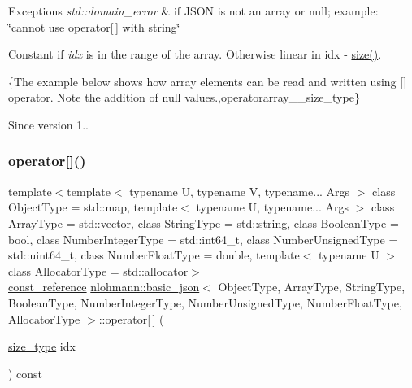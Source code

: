 \begin{DoxyExceptions}{Exceptions}
{\em std\+::domain\+\_\+error} & if J\+S\+ON is not an array or null; example\+: {\ttfamily \char`\"{}cannot use operator\mbox{[}$\,$\mbox{]} with string\char`\"{}}\\
\hline
\end{DoxyExceptions}
Constant if {\itshape idx} is in the range of the array. Otherwise linear in {\ttfamily idx -\/ \hyperlink{classnlohmann_1_1basic__json_a0ea8a1ecca4b3cb0ba09ad7552c364b6}{size()}}.

\{The example below shows how array elements can be read and written using {\ttfamily \mbox{[}\mbox{]}} operator. Note the addition of {\ttfamily null} values.,operatorarray\+\_\+\+\_\+size\+\_\+type\}

\begin{DoxySince}{Since}
version 1.. 
\end{DoxySince}
\hypertarget{classnlohmann_1_1basic__json_a2dea7491d9fa709311459f87201e25aa}{}\label{classnlohmann_1_1basic__json_a2dea7491d9fa709311459f87201e25aa} 
\subsubsection{\texorpdfstring{operator[]()}{operator[]()}\hspace{0.1cm}{\footnotesize\ttfamily [2/10]}}
{\footnotesize\ttfamily template$<$template$<$ typename U, typename V, typename... Args $>$ class Object\+Type = std\+::map, template$<$ typename U, typename... Args $>$ class Array\+Type = std\+::vector, class String\+Type  = std\+::string, class Boolean\+Type  = bool, class Number\+Integer\+Type  = std\+::int64\+\_\+t, class Number\+Unsigned\+Type  = std\+::uint64\+\_\+t, class Number\+Float\+Type  = double, template$<$ typename U $>$ class Allocator\+Type = std\+::allocator$>$ \\
\hyperlink{classnlohmann_1_1basic__json_af677a29b0e66edc9f66e5167e4667071}{const\+\_\+reference} \hyperlink{classnlohmann_1_1basic__json}{nlohmann\+::basic\+\_\+json}$<$ Object\+Type, Array\+Type, String\+Type, Boolean\+Type, Number\+Integer\+Type, Number\+Unsigned\+Type, Number\+Float\+Type, Allocator\+Type $>$\+::operator\mbox{[}$\,$\mbox{]} (\begin{DoxyParamCaption}\item[{\hyperlink{classnlohmann_1_1basic__json_a1579a8f72a230358d6cd1a6e8a62859b}{size\+\_\+type}}]{idx }\end{DoxyParamCaption}) const\hspace{0.3cm}{\ttfamily [inline]}}



